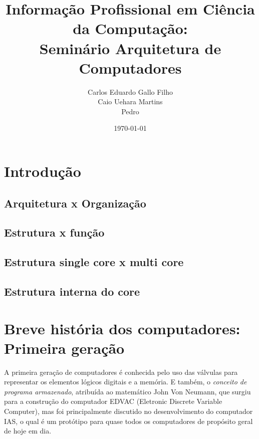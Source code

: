 \documentclass{article}
\title{Informação Profissional em Ciência da Computação:\\
	Seminário Arquitetura de Computadores}
\author{
    Carlos Eduardo Gallo Filho \\
	Caio Uehara Martins \\
	Pedro}
\date{\today}
\begin{document}
	\maketitle
	\graphicspath{ {./images/} }

	\section{Introdução}
		\subsection{Arquitetura x Organização}
		\subsection{Estrutura x função}
		\subsection{Estrutura single core x multi core}
		\subsection{Estrutura interna do core}
	\section{Breve história dos computadores: Primeira geração}
		\begin{flushleft}
			\qquad A primeira geração de computadores é conhecida pelo uso das válvulas para representar os elementos lógicos digitais e a memória. E também, o  	\textit{conceito de programa armazenado}, atribuída ao matemático John Von Neumann, que surgiu para a construção do computador EDVAC (Eletronic Discrete Variable Computer), mas foi principalmente discutido no desenvolvimento do computador IAS, o qual é um protótipo para quase todos os computadores de propósito geral de hoje em dia. 
		\end{flushleft}
\end{document}
